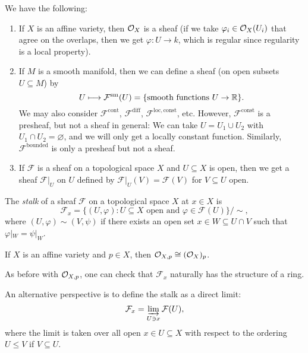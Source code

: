 \begin{example}
  We have the following:
  \begin{enumerate}
    \item If $X$ is an affine variety,
      then $\mathcal{O}_X$ is a sheaf (if we
      take $\varphi_i \in \mathcal{O}_X(U_i)$
      that agree on the overlaps, then we
      get $\varphi : U \to k$, which
      is regular since regularity is
      a local property).
    \item If $M$ is a smooth manifold, then
      we can define a sheaf
      (on open subsets $U \subseteq M$) by
      \[
        U \longmapsto \mathcal{F}^{\mathrm{sm}}(U)
        = \{\text{smooth functions } U \to \mathbb{R}\}.
      \]
      We may also consider
      $\mathcal{F}^{\mathrm{cont}}$,
      $\mathcal{F}^{\mathrm{diff}}$,
      $\mathcal{F}^{\mathrm{loc}, \mathrm{const}}$, etc.
      However, $\mathcal{F}^{\mathrm{const}}$
      is a presheaf, but not a sheaf in
      general: We can take
      $U = U_1 \cup U_2$ with
      $U_1 \cap U_2 = \varnothing$, and
      we will only get
      a locally constant function.
      Similarly, $\mathcal{F}^{\mathrm{bounded}}$
      is only a presheaf but not a sheaf.
    \item If $\mathcal{F}$ is a sheaf
      on a topological space $X$ and
      $U \subseteq X$ is open, then we get
      a sheaf $\mathcal{F}|_U$ on $U$
      defined by
      $\mathcal{F}|_U(V) = \mathcal{F}(V)$
      for $V \subseteq U$ open.
  \end{enumerate}
\end{example}

\begin{definition}
  The \emph{stalk} of a sheaf
  $\mathcal{F}$ on a topological space
  $X$ at $x \in X$ is
  \[
    \mathcal{F}_x
    = \{(U, \varphi) : U \subseteq X \text{ open and } \varphi \in \mathcal{F}(U)\} / {\sim},
  \]
  where $(U, \varphi) \sim (V, \psi)$
  if there exists an open set
  $x \in W \subseteq U \cap V$
  such that $\varphi|_W = \psi|_W$.
\end{definition}

\begin{example}
  If $X$ is an affine variety and
  $p \in X$, then
  $\mathcal{O}_{X, p} \cong (\mathcal{O}_X)_p$.
\end{example}

\begin{remark}
  As before with $\mathcal{O}_{X, p}$, one
  can check that
  $\mathcal{F}_x$ naturally
  has the structure of a ring.
\end{remark}

\begin{remark}
  An alternative perspective
  is to define the stalk as a direct limit:
  \[
    \mathcal{F}_x
    = \varinjlim_{U \ni x} \mathcal{F}(U),
  \]
  where the limit is taken over all
  open $x \in U \subseteq X$
  with respect to the ordering
  $U \le V$ if $V \subseteq U$.
\end{remark}
